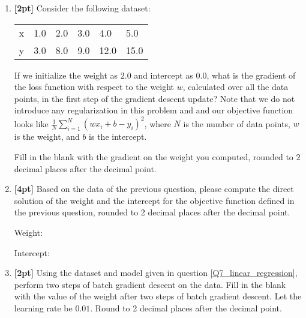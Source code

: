 \begin{enumerate}
    
    \item \textbf{[2pt]} \label{Q7_linear_regression} Consider the following dataset:
    \begin{table}[H]
    \centering
        \begin{tabular}{llllll}
        x & 1.0 & 2.0 & 3.0 & 4.0 & 5.0 \\
        y & 3.0 & 8.0 & 9.0 & 12.0 & 15.0
        \end{tabular}
    \end{table}
    If we initialize the weight as $2.0$ and intercept as $0.0$, what is the gradient of the loss function with respect to the weight $w$, calculated over all the data points, in the first step of the gradient descent update? Note that we do not introduce any regularization in this problem and and our objective function looks like $\frac{1}{N}\sum_{i=1}^N (wx_i + b - y_i)^2$, where $N$ is the number of data points, $w$ is the weight, and $b$ is the intercept.
    
    Fill in the blank with the gradient on the weight you computed, rounded to 2 decimal places after the decimal point.
    
    \begin{tcolorbox}[fit,height=1cm, width=4cm, blank, borderline={1pt}{-2pt},nobeforeafter]
    \end{tcolorbox}
    
    
    
    \item \textbf{[4pt]} Based on the data of the previous question, please compute the direct solution of the weight and the intercept for the objective function defined in the previous question, rounded to 2 decimal places after the decimal point.
    
    Weight: \quad
    \begin{tcolorbox}[fit,height=1cm, width=4cm, blank, borderline={1pt}{-2pt},nobeforeafter]
    \end{tcolorbox}
    
    
    Intercept: \quad
    \begin{tcolorbox}[fit,height=1cm, width=4cm, blank, borderline={1pt}{-2pt},nobeforeafter]
    \end{tcolorbox}
    
    
    
    \newpage
    \item \textbf{[2pt]} Using the dataset and model given in question \ref{Q7_linear_regression}, perform two steps of batch gradient descent on the data. Fill in the blank with the value of the weight after two steps of batch gradient descent. Let the learning rate be $0.01$. Round to 2 decimal places after the decimal point.
    

\end{enumerate}
